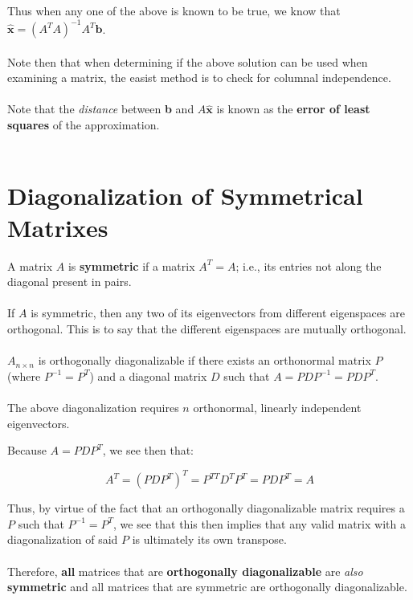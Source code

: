 \documentclass[12pt]{article}
\newcommand{\bt}[1]{\textbf{{#1}}}
\newcommand{\bm}[1]{\mathbf{{#1}}}
\begin{document}
Thus when any one of the above is known to be true, we know that $\bm{\hat{x}} = (A^T A)^{-1} A^T \bm{b}$. \\ \\

Note then that when determining if the above solution can be used when examining a matrix, the easist method is to check for columnal independence. \\ \\

Note that the \emph{distance} between \bt{b} and $A\bm{\hat{x}}$ is known as the \bt{error of least squares} of the
approximation. \\ \\

\section*{Diagonalization of Symmetrical Matrixes}

A matrix $A$ is \bt{symmetric} if a matrix $A^T = A$; i.e., its entries
not along the diagonal present in pairs. \\ \\

If $A$ is symmetric, then any two of its eigenvectors from different
eigenspaces are orthogonal. This is to say that the different eigenspaces
are mutually orthogonal. \\ \\

$A_{n \times n}$ is orthogonally diagonalizable if there exists an
orthonormal matrix $P$ (where $P^{-1} = P^T$) and a diagonal matrix $D$
such that $A = PDP^{-1} = PDP^T$. \\ \\

The above diagonalization requires $n$ orthonormal, linearly independent eigenvectors.

Because $A = PDP^T$, we see then that:

$$A^T = (PDP^T)^T = P^{TT}D^T P^T = PDP^T = A$$

Thus, by virtue of the fact that an orthogonally diagonalizable matrix
requires a $P$ such that $P^{-1} = P^T$, we see that this then implies
that any valid matrix with a diagonalization of said $P$ is ultimately
its own transpose. \\ \\

Therefore, \bt{all} matrices that are \bt{orthogonally diagonalizable} are \emph{also} \bt{symmetric} and all
matrices that are symmetric are orthogonally diagonalizable. \\ \\
\end{document}
